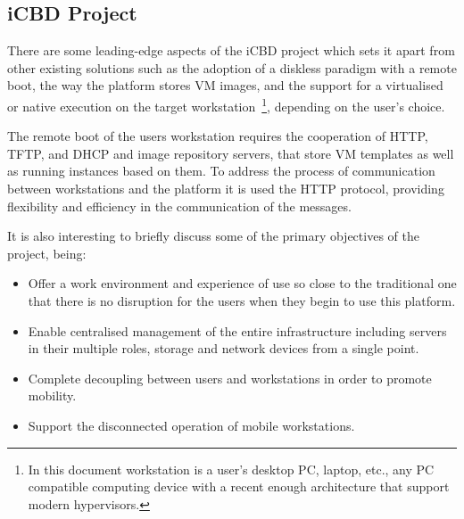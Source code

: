


\subsection{iCBD Project} %
\label{sub:intro_icbd_project}

There are some leading-edge aspects of the \acrfull{iCBD} project which sets it apart from other existing solutions such as the adoption of a diskless paradigm with a remote boot, the way the platform stores \gls{VM} images, and the support for a virtualised or native execution on the target workstation~\footnote{In this document workstation is a user's desktop PC, laptop, etc., any PC compatible computing device with a recent enough architecture that support modern hypervisors.}, depending on the user's choice.~\cite{P2020}

The remote boot of the users workstation requires the cooperation of \acrshort{HTTP}, \acrshort{TFTP}, and \acrshort{DHCP} and image repository servers, that store VM templates as well as running instances based on them.
To address the process of communication between workstations and the platform it is used the HTTP protocol, providing flexibility and efficiency in the communication of the messages.~\cite{P2020,Nuno2016,Eduardo2016}



It is also interesting to briefly discuss some of the primary objectives of the project, being:
\begin{itemize}
    \item Offer a work environment and experience of use so close to the traditional one that there is no disruption for the users when they begin to use this platform.
    \item Enable centralised management of the entire infrastructure including servers in their multiple roles, storage and network devices from a single point.
    \item Complete decoupling between users and workstations in order to promote mobility.
    \item Support the disconnected operation of mobile workstations.
\end{itemize}

